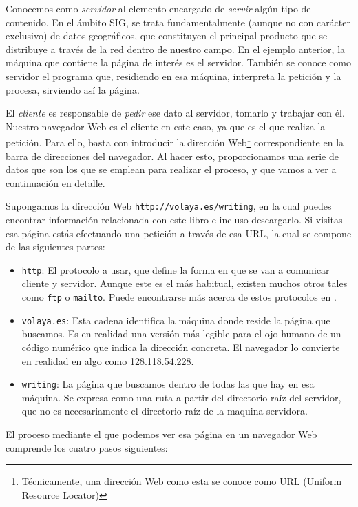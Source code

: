 Conocemos como \emph{servidor} al elemento encargado de \emph{servir} algún tipo de contenido. En el ámbito SIG, se trata fundamentalmente (aunque no con carácter exclusivo) de datos geográficos, que constituyen el principal producto que se distribuye a través de la red dentro de nuestro campo. En el ejemplo anterior, la máquina que contiene la página de interés es el servidor. También se conoce como servidor el programa que, residiendo en esa máquina, interpreta la petición y la procesa, sirviendo así la página.

El \emph{cliente} es responsable de \emph{pedir} ese dato al servidor, tomarlo y trabajar con él. Nuestro navegador Web es el cliente en este caso, ya que es el que realiza la petición. Para ello, basta con introducir la dirección Web\footnote{Técnicamente, una dirección Web como esta se conoce como URL (Uniform Resource Locator)} correspondiente en la barra de direcciones del navegador. Al hacer esto, proporcionamos una serie de datos que son los que se emplean para realizar el proceso, y que vamos a ver a continuación en detalle.

Supongamos la dirección Web \texttt{http://volaya.es/writing}, en la cual puedes encontrar información relacionada con este libro e incluso descargarlo. Si visitas esa página estás efectuando una petición a través de esa URL, la cual se compone de las siguientes partes:

\begin{itemize}
	\item \texttt{http}: El protocolo a usar, que define la forma en que se van a comunicar cliente y servidor. Aunque este es el más habitual, existen muchos otros tales como \texttt{ftp} o \texttt{mailto}. Puede encontrarse más acerca de estos protocolos en \cite{protocolosWeb}.
	\item \texttt{volaya.es}: Esta cadena identifica la máquina donde reside la página que buscamos. Es en realidad una versión más legible para el ojo humano de un código numérico que indica la dirección concreta. El navegador lo convierte en realidad en algo como 128.118.54.228.
	\item \texttt{writing}: La página que buscamos dentro de todas las que hay en esa máquina. Se expresa como una ruta a partir del directorio raíz del servidor, que no es necesariamente el directorio raíz de la maquina servidora.
\end{itemize}

El proceso mediante el que podemos ver esa página en un navegador Web comprende los cuatro pasos siguientes:


